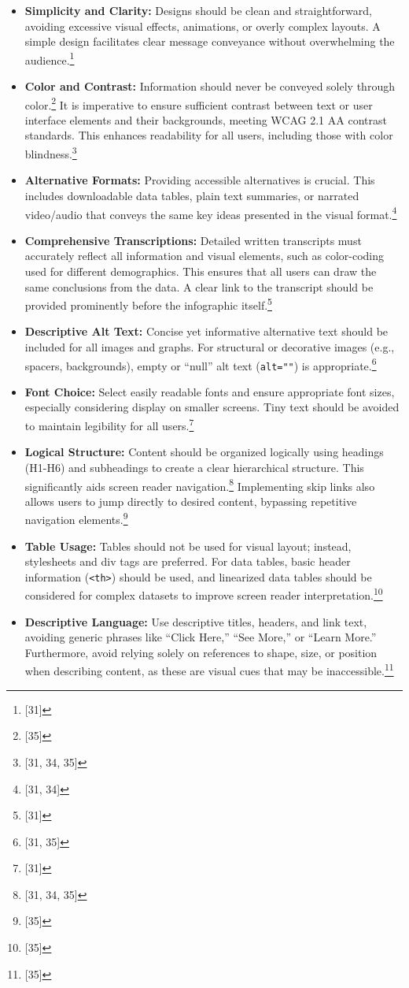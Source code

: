 \vspace{1em}
\begin{itemize}
    \item \textbf{Simplicity and Clarity:} Designs should be clean and straightforward, avoiding excessive visual effects, animations, or overly complex layouts. A simple design facilitates clear message conveyance without overwhelming the audience.\footnote{[31]}
    \item \textbf{Color and Contrast:} Information should never be conveyed solely through color.\footnote{[35]} It is imperative to ensure sufficient contrast between text or user interface elements and their backgrounds, meeting WCAG 2.1 AA contrast standards. This enhances readability for all users, including those with color blindness.\footnote{[31, 34, 35]}
    \item \textbf{Alternative Formats:} Providing accessible alternatives is crucial. This includes downloadable data tables, plain text summaries, or narrated video/audio that conveys the same key ideas presented in the visual format.\footnote{[31, 34]}
    \item \textbf{Comprehensive Transcriptions:} Detailed written transcripts must accurately reflect all information and visual elements, such as color-coding used for different demographics. This ensures that all users can draw the same conclusions from the data. A clear link to the transcript should be provided prominently before the infographic itself.\footnote{[31]}
    \item \textbf{Descriptive Alt Text:} Concise yet informative alternative text should be included for all images and graphs. For structural or decorative images (e.g., spacers, backgrounds), empty or ``null'' alt text (\texttt{alt=""}) is appropriate.\footnote{[31, 35]}
    \item \textbf{Font Choice:} Select easily readable fonts and ensure appropriate font sizes, especially considering display on smaller screens. Tiny text should be avoided to maintain legibility for all users.\footnote{[31]}
    \item \textbf{Logical Structure:} Content should be organized logically using headings (H1-H6) and subheadings to create a clear hierarchical structure. This significantly aids screen reader navigation.\footnote{[31, 34, 35]} Implementing skip links also allows users to jump directly to desired content, bypassing repetitive navigation elements.\footnote{[35]}
    \item \textbf{Table Usage:} Tables should not be used for visual layout; instead, stylesheets and div tags are preferred. For data tables, basic header information (\texttt{<th>}) should be used, and linearized data tables should be considered for complex datasets to improve screen reader interpretation.\footnote{[35]}
    \item \textbf{Descriptive Language:} Use descriptive titles, headers, and link text, avoiding generic phrases like ``Click Here,'' ``See More,'' or ``Learn More.'' Furthermore, avoid relying solely on references to shape, size, or position when describing content, as these are visual cues that may be inaccessible.\footnote{[35]}
\end{itemize}
